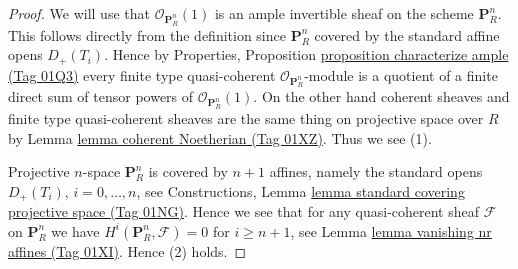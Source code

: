 \documentclass{amsart}
\theoremstyle{plain}
\theoremstyle{definition}
\theoremstyle{remark}
\numberwithin{equation}{subsection}
\begin{document}
\begin{proof}
We will use that $\mathcal{O}_{\mathbf{P}^n_R}(1)$ is an ample invertible
sheaf on
the scheme $\mathbf{P}^n_R$. This follows directly from the definition
since $\mathbf{P}^n_R$ covered by the standard affine opens $D_{+}(T_i)$.
Hence by
Properties, Proposition \href{https://stacks.math.columbia.edu/tag/01Q3}{proposition characterize ample (Tag 01Q3)}
every finite type quasi-coherent $\mathcal{O}_{\mathbf{P}^n_R}$-module
is a quotient of a finite direct sum of tensor powers of
$\mathcal{O}_{\mathbf{P}^n_R}(1)$. On the other hand coherent sheaves
and finite type quasi-coherent sheaves are the same thing on projective
space over $R$ by Lemma \href{https://stacks.math.columbia.edu/tag/01XZ}{lemma coherent Noetherian (Tag 01XZ)}. Thus we see (1).

\medskip\noindent
Projective $n$-space $\mathbf{P}^n_R$ is covered by $n + 1$ affines,
namely the standard opens $D_{+}(T_i)$, $i = 0, \ldots, n$, see Constructions,
Lemma \href{https://stacks.math.columbia.edu/tag/01NG}{lemma standard covering projective space (Tag 01NG)}.
Hence we see that for any quasi-coherent
sheaf $\mathcal{F}$ on $\mathbf{P}^n_R$
we have $H^i(\mathbf{P}^n_R, \mathcal{F}) = 0$ for $i \geq n + 1$,
see Lemma \href{https://stacks.math.columbia.edu/tag/01XI}{lemma vanishing nr affines (Tag 01XI)}. Hence (2) holds.


\end{proof}
\end{document}
